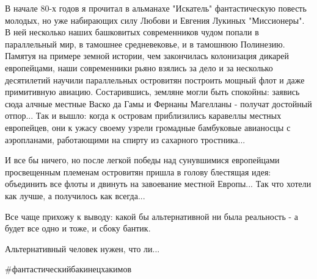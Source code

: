 В начале 80-х годов я прочитал в альманахе "Искатель" фантастическую повесть
молодых, но уже набирающих силу Любови и Евгения Лукиных "Миссионеры". В ней
несколько наших башковитых современников чудом попали в параллельный мир, в
тамошнее средневековье, и в тамошнюю Полинезию. Памятуя на примере земной
истории, чем закончилась колонизация дикарей европейцами, наши современники
рьяно взялись за дело и за несколько десятилетий научили параллельных
островитян построить мощный флот и даже примитивную авиацию. Состарившись,
земляне могли быть спокойны: заявись сюда алчные местные Васко да Гамы и
Фернаны Магелланы - получат достойный отпор... Так и вышло: когда к островам
приблизились каравеллы местных европейцев, они к ужасу своему узрели громадные
бамбуковые авианосцы с аэропланами, работающими на спирту из сахарного
тростника...

И все бы ничего, но после легкой победы над сунувшимися европейцами
просвещенным племенам островитян пришла в голову блестящая идея: объединить все
флоты и двинуть на завоевание местной Европы... Так что хотели как лучше, а
получилось как всегда...

Все чаще прихожу к выводу: какой бы альтернативной ни была реальность - а будет
все одно и тоже, и сбоку бантик.

Альтернативный человек нужен, что ли...

\#фантастическийбакинецхакимов

